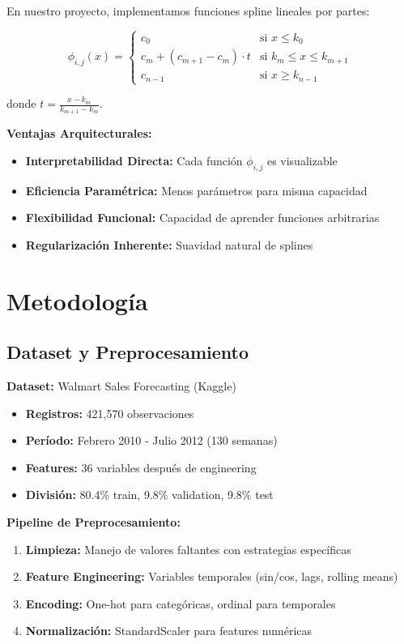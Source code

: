 \documentclass[10pt,twocolumn]{article}
\begin{document}
En nuestro proyecto, implementamos funciones spline lineales por partes:

\begin{equation}
\phi_{i,j}(x) = \begin{cases}
c_0 & \text{si } x \leq k_0 \\
c_m + (c_{m+1}-c_m) \cdot t & \text{si } k_m \leq x \leq k_{m+1} \\
c_{n-1} & \text{si } x \geq k_{n-1}
\end{cases}
\end{equation}

donde $t = \frac{x - k_m}{k_{m+1} - k_m}$.

\textbf{Ventajas Arquitecturales:}
\begin{itemize}
    \item \textbf{Interpretabilidad Directa:} Cada función $\phi_{i,j}$ es visualizable
    \item \textbf{Eficiencia Paramétrica:} Menos parámetros para misma capacidad
    \item \textbf{Flexibilidad Funcional:} Capacidad de aprender funciones arbitrarias
    \item \textbf{Regularización Inherente:} Suavidad natural de splines
\end{itemize}

\section{Metodología}

\subsection{Dataset y Preprocesamiento}

\textbf{Dataset:} Walmart Sales Forecasting (Kaggle)
\begin{itemize}
    \item \textbf{Registros:} 421,570 observaciones
    \item \textbf{Período:} Febrero 2010 - Julio 2012 (130 semanas)
    \item \textbf{Features:} 36 variables después de engineering
    \item \textbf{División:} 80.4\% train, 9.8\% validation, 9.8\% test
\end{itemize}

\textbf{Pipeline de Preprocesamiento:}
\begin{enumerate}
    \item \textbf{Limpieza:} Manejo de valores faltantes con estrategias específicas
    \item \textbf{Feature Engineering:} Variables temporales (sin/cos, lags, rolling means)
    \item \textbf{Encoding:} One-hot para categóricas, ordinal para temporales
    \item \textbf{Normalización:} StandardScaler para features numéricas
\end{enumerate}
\end{document}
